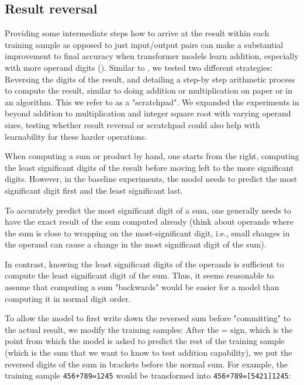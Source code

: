 \subsection{Result reversal}
\label{methods:reversal}

Providing some intermediate steps how to arrive at the result within each training sample as opposed to just input/output pairs can make a substantial improvement to final accuracy when transformer models learn addition, especially with more operand digits ().
Similar to \cite{teaching}, we tested two different strategies: Reversing the digits of the result, and detailing a step-by step arithmetic process to compute the result, similar to doing addition or multiplication on paper or in an algorithm. This we refer to as a "scratchpad". We expanded the experiments in \cite{teaching} beyond addition to multiplication and integer square root with varying operand sizes, testing whether result reversal or scratchpad could also help with learnability for these harder operations.

When computing a sum or product by hand, one starts from the right, computing the least significant digits of the result before moving left to the more significant digits. However, in the baseline experiments, the model needs to predict the most significant digit first and the least significant last.

To accurately predict the most significant digit of a sum, one generally needs to have the exact result of the sum computed already (think about operands where the sum is close to wrapping on the most-significant digit, i.e., small changes in the operand can cause a change in the most significant digit of the sum).

In contrast, knowing the least significant digits of the operands is sufficient to compute the least significant digit of the sum. Thus, it seems reasonable to assume that computing a sum "backwards" would be easier for a model than computing it in normal digit order.


To allow the model to first write down the reversed sum before "committing" to the actual result, we modify the training samples: After the = sign, which is the point from which the model is asked to predict the rest of the training sample (which is the sum that we want to know to test addition capability), we put the reversed digits of the sum in brackets before the normal sum.
For example, the training sample \verb!456+789=1245!
would be transformed into \verb!456+789=[5421]1245!:

